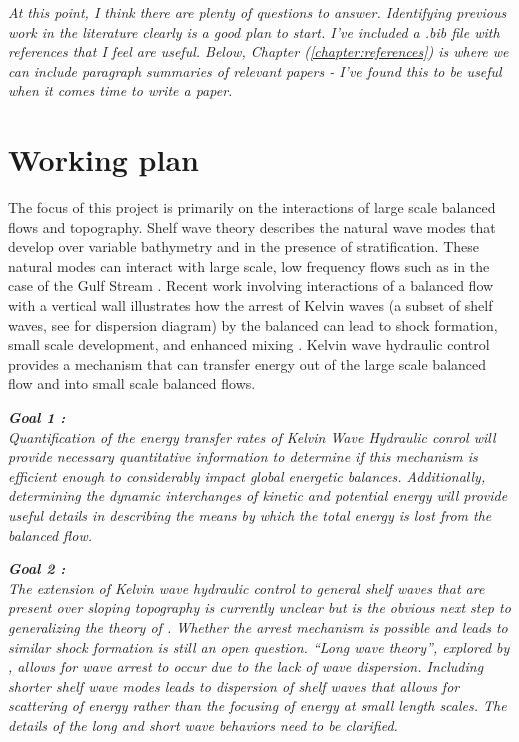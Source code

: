 \documentclass[12pt]{workjournal}
\begin{document}
\textit{At this point, I think there are plenty of questions to answer. Identifying previous work in the literature clearly is a good plan to start. I've included a .bib file with references that I feel are useful. Below, Chapter (\ref{chapter:references}) is where we can include paragraph summaries of relevant papers - I've found this to be useful when it comes time to write a paper.}


\chapter{Working plan}
 The focus of this project is primarily on the interactions of large scale balanced flows and topography. Shelf wave theory \citep{Buchwald1968,Rhines1970,Huthnance1975,Huthnance1978,Hughes1986} describes the natural wave modes that develop over variable bathymetry and in the presence of stratification. These natural modes can interact with large scale, low frequency flows such as in the case of the Gulf Stream \citep{Xue1992,Lozier2005}. Recent work involving interactions of a balanced flow with a vertical wall illustrates how the arrest of Kelvin waves (a subset of shelf waves, see \citep{ChapmanRizzoli1989} for dispersion diagram) by the balanced can lead to shock formation, small scale development, and enhanced mixing \citep{Dewar2010,Hogg2011}. Kelvin wave hydraulic control provides a mechanism that can transfer energy out of the large scale balanced flow and into small scale balanced flows.
 
\textit{\textbf{Goal 1 :}}\\ 
 \textit{ Quantification of the energy transfer rates of Kelvin Wave Hydraulic conrol will provide necessary quantitative information to determine if this mechanism is efficient enough to considerably impact global energetic balances. Additionally, determining the dynamic interchanges of kinetic and potential energy will provide useful details in describing the means by which the total energy is lost from the balanced flow.}
 
\textit{\textbf{Goal 2 :}}\\
\textit{ The extension of Kelvin wave hydraulic control to general shelf waves that are present over sloping topography is currently unclear but is the obvious next step to generalizing the theory of \citet{Hogg2011}. Whether the arrest mechanism is possible and leads to similar shock formation is still an open question. ``Long wave theory'', explored by \citep{Hughes1986,Stern1998}, allows for wave arrest to occur due to the lack of wave dispersion. Including shorter shelf wave modes leads to dispersion of shelf waves that allows for scattering of energy rather than the focusing of energy at small length scales. The details of the long and short wave behaviors need to be clarified.}
 
\end{document}
